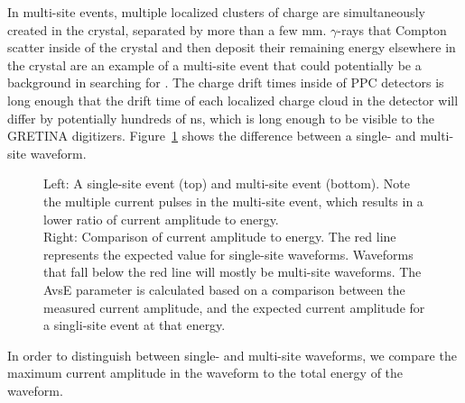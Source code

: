 \documentclass[/main.tex]{subfiles}
\begin{document}
In multi-site events, multiple localized clusters of charge are simultaneously created in the crystal, separated by more than a few mm.
$\gamma$-rays that Compton scatter inside of the crystal and then deposit their remaining energy elsewhere in the crystal are an example of a multi-site event that could potentially be a background in searching for \znbb.
The charge drift times inside of PPC detectors is long enough that the drift time of each localized charge cloud in the detector will differ by potentially hundreds of ns, which is long enough to be visible to the GRETINA digitizers.
Figure~\ref{fig:avse} shows the difference between a single- and multi-site waveform.

\begin{figure}
  \centering
  \caption[Multi-site event cut]{\label{fig:avse}
    Left: A single-site event (top) and multi-site event (bottom). Note the multiple current pulses in the multi-site event, which results in a lower ratio of current amplitude to energy.\\
    Right: Comparison of current amplitude to energy. The red line represents the expected value for single-site waveforms. Waveforms that fall below the red line will mostly be multi-site waveforms. The AvsE parameter is calculated based on a comparison between the measured current amplitude, and the expected current amplitude for a singli-site event at that energy.
  }
\end{figure}
In order to distinguish between single- and multi-site waveforms, we compare the maximum current amplitude in the waveform to the total energy of the waveform\cite{mjdavse}.
\end{document}
